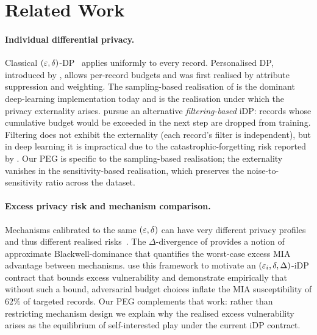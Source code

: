 \section{Related Work}
\label{sec:related}

\paragraph{Individual differential privacy.}
Classical $(\varepsilon,\delta)$-DP~\cite{dwork2006calibrating} applies uniformly to
every record. Personalised DP, introduced by
\citet{jorgensen2015conservative}, allows per-record budgets and was first
realised by attribute suppression and weighting. The sampling-based
realisation of \citet{boenisch2023have} is the dominant deep-learning
implementation today and is the realisation under which the privacy
externality arises. \citet{feldman2021individual} pursue an alternative
\emph{filtering-based} iDP: records whose cumulative budget would be exceeded
in the next step are dropped from training. Filtering does not exhibit the
externality (each record's filter is independent), but in deep learning it
is impractical due to the catastrophic-forgetting risk reported by
\citet{boenisch2023have}. Our PEG is specific to the sampling-based
realisation; the externality vanishes in the sensitivity-based realisation,
which preserves the noise-to-sensitivity ratio across the dataset.

\paragraph{Excess privacy risk and mechanism comparison.}
Mechanisms calibrated to the same $(\varepsilon,\delta)$ can have very different
privacy profiles and thus different realised
risks~\cite{kaissis2024beyond, balle2020privacy, dong2022gaussian}. The
$\Delta$-divergence of \citet{kaissis2024beyond} provides a notion of
approximate Blackwell-dominance that quantifies the worst-case excess MIA
advantage between mechanisms. \citet{kaiser2026your} use this framework to
motivate an $(\varepsilon_i, \delta, \Delta)$-iDP contract that bounds excess
vulnerability and demonstrate empirically that without such a bound,
adversarial budget choices inflate the MIA susceptibility of $62\%$ of
targeted records. Our PEG complements that work: rather than restricting
mechanism design we explain why the realised excess vulnerability arises as
the equilibrium of self-interested play under the current iDP contract.

